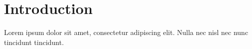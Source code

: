 \chapter{Introduction}\label{ch:introduction}
Lorem ipsum dolor sit amet, consectetur adipiscing elit.
Nulla nec nisl nec nunc tincidunt tincidunt.